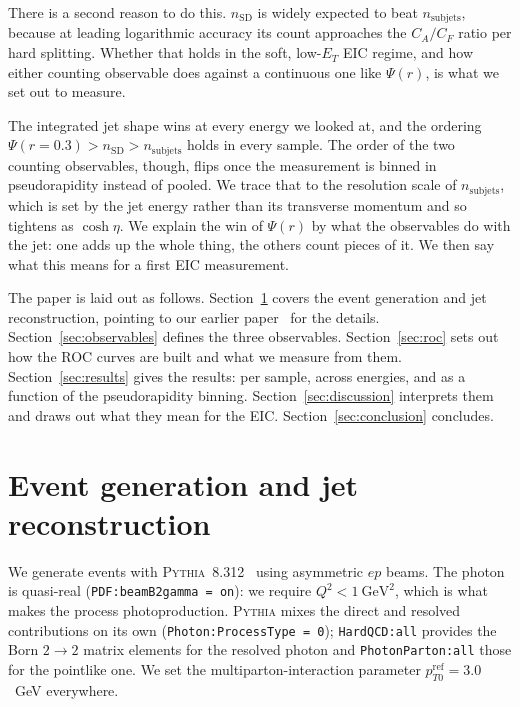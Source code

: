\documentclass[reprint,amsmath,amssymb,aps,prd,floatfix]{revtex4-2}
\begin{document}
There is a second reason to do this. $n_{\mathrm{SD}}$ is widely expected to
beat $n_{\mathrm{subjets}}$, because at leading logarithmic accuracy its count
approaches the $C_A / C_F$ ratio per hard splitting. Whether that holds in the
soft, low-$E_T$ EIC regime, and how either counting observable does against a
continuous one like $\Psi(r)$, is what we set out to measure.

The integrated jet shape wins at every energy we looked at, and the ordering
$\Psi(r=0.3) > n_{\mathrm{SD}} > n_{\mathrm{subjets}}$ holds in every sample.
The order of the two counting observables, though, flips once the measurement
is binned in pseudorapidity instead of pooled. We trace that to the resolution
scale of $n_{\mathrm{subjets}}$, which is set by the jet energy rather than its
transverse momentum and so tightens as $\cosh\eta$. We explain the win of
$\Psi(r)$ by what the observables do with the jet: one adds up the whole thing,
the others count pieces of it. We then say what this means for a first EIC
measurement.

The paper is laid out as follows. Section~\ref{sec:generation} covers the event
generation and jet reconstruction, pointing to our earlier
paper~\cite{Singh:2026photo} for the details. Section~\ref{sec:observables}
defines the three observables. Section~\ref{sec:roc} sets out how the ROC curves
are built and what we measure from them. Section~\ref{sec:results} gives the
results: per sample, across energies, and as a function of the pseudorapidity
binning. Section~\ref{sec:discussion} interprets them and draws out what they
mean for the EIC. Section~\ref{sec:conclusion} concludes.

\section{Event generation and jet reconstruction}\label{sec:generation}

We generate events with \textsc{Pythia}~8.312~\cite{10.21468/SciPostPhysCodeb.8}
using asymmetric $ep$ beams. The photon is quasi-real
(\texttt{PDF:beamB2gamma = on}): we require $Q^2 < 1~\mathrm{GeV}^2$, which is
what makes the process photoproduction.
\textsc{Pythia} mixes the direct and resolved contributions on its own
(\texttt{Photon:ProcessType = 0}); \texttt{HardQCD:all} provides the Born
$2\to2$ matrix elements for the resolved photon and \texttt{PhotonParton:all}
those for the pointlike one. We set the multiparton-interaction parameter
$p_{T0}^{\mathrm{ref}} = 3.0$~GeV everywhere.
\end{document}

